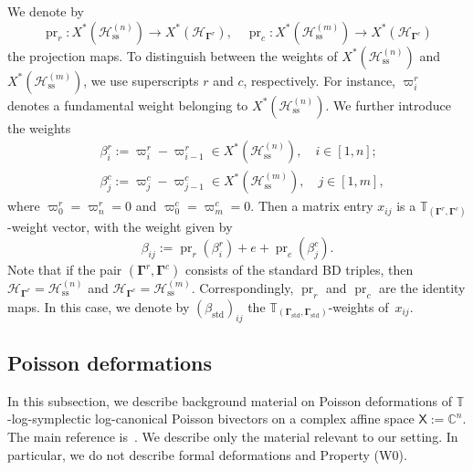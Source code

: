 \documentclass[11pt]{article}
\newcommand{\bg}{\mathbf{\Gamma}}
\newcommand{\std}{\mathrm{std}}
\DeclareMathOperator{\pr}{pr}
\DeclareMathOperator{\ses}{ss}
\theoremstyle{definition}\newtheorem{definition}[theorem]{Definition}
\theoremstyle{definition}\newtheorem{remark}[theorem]{Remark}
\theoremstyle{remark}
\numberwithin{equation}{section}
\begin{document}
We denote by
\begin{equation*}
    \pr_r : X^*(\mathcal{H}_{\ses}^{(n)}) \rightarrow X^*(\mathcal{H}_{\bg^r}), \quad \pr_c : X^*(\mathcal{H}_{\ses}^{(m)}) \rightarrow X^*(\mathcal{H}_{\bg^c})
\end{equation*}
the projection maps. To distinguish between the weights of $X^*(\mathcal{H}_{\ses}^{(n)})$ and $X^*(\mathcal{H}_{\ses}^{(m)})$, we use superscripts $r$ and $c$, respectively. For instance, $\varpi_i^r$ denotes a fundamental weight belonging to $X^*(\mathcal{H}_{\ses}^{(n)})$. We further introduce the weights
\begin{align*}
    &\beta_i^r := \varpi_i^r - \varpi_{i-1}^r \in X^*(\mathcal{H}_{\ses}^{(n)}), \quad i \in [1,n];\\
    &\beta_j^c := \varpi_j^c - \varpi_{j-1}^c \in X^*(\mathcal{H}_{\ses}^{(m)}), \quad j \in [1,m],
\end{align*}
where $\varpi_{0}^r = \varpi_n^r = 0$ and $\varpi_0^c =\varpi_m^c = 0$. Then a matrix entry $x_{ij}$ is a $\mathbb{T}_{(\bg^r,\bg^c)}$-weight vector, with the weight given by
\begin{equation*}
    \beta_{ij}:=\pr_r(\beta_i^r) + e + \pr_c(\beta_j^c).
\end{equation*}
Note that if the pair $(\bg^r,\bg^c)$ consists of the standard BD triples, then $\mathcal{H}_{\bg^r} = \mathcal{H}_{\ses}^{(n)}$ and $\mathcal{H}_{\bg^c} = \mathcal{H}_{\ses}^{(m)}$. Correspondingly, $\pr_r$ and $\pr_c$ are the identity maps. In this case, we denote by $(\beta_{\std})_{ij}$ the $\mathbb{T}_{(\bg_{\std},\bg_{\std})}$-weights of~$x_{ij}$.

\subsection{Poisson deformations}\label{s:background_deform}

In this subsection, we describe background material on Poisson deformations of $\mathbb{T}$-log-symplectic log-canonical Poisson bivectors on a complex affine space $\mathsf{X}:=\mathbb{C}^n$. The main reference is~\cite{lm-deform}. We describe only the material relevant to our setting. In particular, we do not describe formal deformations and Property (W0). 
\end{document}
